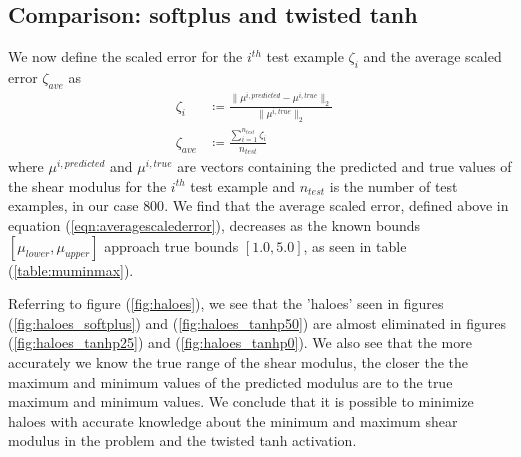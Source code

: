 \documentclass[10pt]{article}
\begin{document}
\subsection{\label{sect:compsofttanh} Comparison: softplus and twisted tanh}
We now define the scaled error for the $i^{th}$  test example $\zeta_{i}$ and the average scaled error $\zeta_{ave}$ as
\begin{subequations}
  \begin{align}
  \zeta_{i} &\coloneqq \frac{\|\mu^{i,predicted} - \mu^{i,true}\|_{2}}{\|\mu^{i,true}\|_{2}}  &\label{eqn:scalederror}\\
  \zeta_{ave} &\coloneqq \frac{\sum_{i=1}^{n_{test}}\zeta_{i}}{n_{test}} &\label{eqn:averagescalederror}
  \end{align}
\end{subequations}
where $\mu^{i,predicted}$ and $\mu^{i,true}$ are vectors containing the predicted and true values of the shear modulus for the $i^{th}$ test example and $n_{test}$ is the number of test examples, in our case $800$. We find that the average scaled error, defined above in equation (\ref{eqn:averagescalederror}), decreases as the known bounds $[\mu_{lower},\mu_{upper}]$ approach true bounds $[1.0,5.0]$, as seen in table (\ref{table:muminmax}).

Referring to figure (\ref{fig:haloes}), we see that the 'haloes' seen in figures (\ref{fig:haloes_softplus}) and (\ref{fig:haloes_tanhp50}) are almost eliminated in figures (\ref{fig:haloes_tanhp25}) and (\ref{fig:haloes_tanhp0}). We also see that the more accurately we know the true range of the shear modulus, the closer the the maximum and minimum values of the predicted modulus are to the true maximum and minimum values. We conclude that it is possible to minimize haloes with accurate knowledge about the minimum and maximum shear modulus in the problem and the twisted tanh activation.
\end{document}
